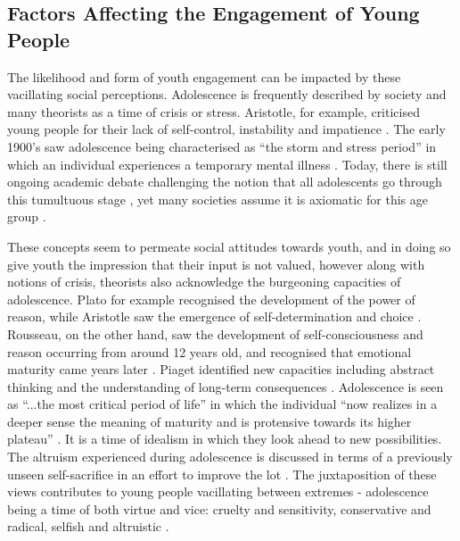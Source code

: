 \subsection{Factors Affecting the Engagement of Young People}
The likelihood and form of youth engagement can be impacted by these vacillating social perceptions. Adolescence is frequently described by society and many theorists as a time of crisis or stress. Aristotle, for example, criticised young people for their lack of self-control, instability and impatience \citep[][p12]{Santrock2010}. The early 1900’s saw adolescence being characterised as “the storm and stress period” \citep[][p73]{Hall1904} in which an individual experiences a temporary mental illness \citep{Mueller2009}. Today, there is still ongoing academic debate challenging the notion that all adolescents go through this tumultuous stage \citep{Muuss1975}, yet many societies assume it is axiomatic for this age group \citep{Stevens2007}.

These concepts seem to permeate social attitudes towards youth, and in doing so give youth the impression that their input is not valued, however along with notions of crisis, theorists also acknowledge the burgeoning capacities of adolescence. Plato for example recognised the development of the power of reason, while Aristotle saw the emergence of self-determination and choice \citep[][]{Santrock2010}. Rousseau, on the other hand, saw the development of self-consciousness and reason occurring from around 12 years old, and recognised that emotional maturity came years later \citep[][]{Santrock2010}. Piaget identified new capacities including abstract thinking and the understanding of long-term consequences \citep{Dulit1972}. Adolescence is seen as “...the most critical period of life” in which the individual “now realizes in a deeper sense the meaning of maturity and is protensive towards its higher plateau” \citep[][p72]{Hall1904}. It is a time of idealism in which they look ahead to new possibilities. The altruism experienced during adolescence is discussed in terms of a previously unseen self-sacrifice in an effort to improve the lot \citep{Hall1904}. The juxtaposition of these views contributes to young people vacillating between extremes - adolescence being a time of both virtue and vice: cruelty and sensitivity, conservative and radical, selfish and altruistic \citep[][]{Hall1904}. 

